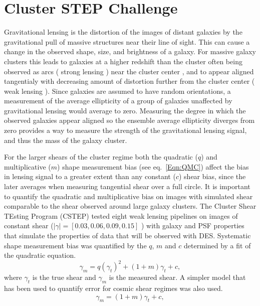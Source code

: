 \documentclass[useAMS,usenatbib]{mn2e}
\begin{document}
\section{Cluster STEP Challenge}
Gravitational lensing is the distortion of the images of
distant galaxies by the gravitational pull of massive structures near
their line of sight. This can
cause a change in the observed shape, size, and brightness of a
galaxy. For massive galaxy clusters this leads to galaxies at a
higher redshift than the cluster often being
observed as arcs ( strong lensing ) near the cluster center , and to
appear aligned tangentialy with decreasing amount of distortion further from
the cluster center ( weak lensing ). Since galaxies are assumed to
have random orientations, a measurement of the average ellipticity of
a group of galaxies unaffected by gravitational lensing would average
to zero. Measuring the degree in which the observed galaxies appear aligned so
the ensemble average ellipticity diverges from zero provides a way to 
measure the strength of the gravitational lensing signal, and thus the
mass of the galaxy cluster. 

\indent For the
larger shears of the cluster regime both the quadratic ($q$) and
multiplicative ($m$) shape measurement bias (see eq.~\ref{Eqn:QMC})
affect the bias in lensing signal to a greater extent than any
constant ($c$) shear bias, since the later averages when measuring
tangential shear over a full circle. It is
important to quantify the quadratic and multiplicative bias on images
with simulated shear comparable to the shear observed around large
galaxy clusters. The Cluster Shear TEsting Program (CSTEP) tested eight weak lensing pipelines on images of constant shear
($|\gamma| = [0.03, 0.06, 0.09, 0.15]$ ) with galaxy and PSF properties that simulate the properties
of data that will be observed with DES. Systematic shape measurement bias was quantified by the $q$, $m$ and $c$
determined by a fit of the quadratic equation.
\begin{equation}\label{Eqn:QMC}
\gamma_m = q (\gamma_t)^2 + (1+m) \gamma_t + c,
\end {equation}
where $\gamma_t$ is the true shear and $\gamma_m$ is the measured
shear. A simpler model that has been used to quantify error
for cosmic shear regimes was also used.
\begin{equation}\label{Eqn:MC}
\gamma_m = (1+m) \gamma_t + c,
\end {equation}
\end{document}
